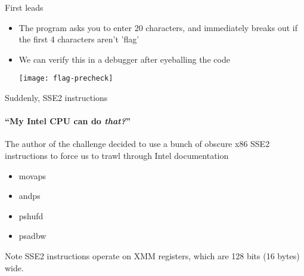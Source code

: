 \begin{frame}{First leads}
    \begin{itemize}
        \item<1-> The program asks you to enter 20 characters, and immediately
                  breaks out if the first 4 characters aren't 'flag'
        \item<2-> We can verify this in a debugger after eyeballing the code

        \begin{center}
             {\texttt{[image: flag-precheck]}}
        \end{center}
    \end{itemize}
\end{frame}

\begin{frame}{Suddenly, SSE2 instructions}
    \framesubtitle{``My Intel CPU can do {\em that?}''}
    The author of the challenge decided to use a bunch of obscure x86 SSE2
    instructions to force us to trawl through Intel documentation

    \begin{itemize}
        \item<2-> movaps
        \item<2-> andps
        \item<2-> pshufd
        \item<2-> psadbw
    \end{itemize}

    \begin{block}{Note}
        SSE2 instructions operate on XMM registers, which are 128 bits
        (16 bytes) wide.
    \end{block}
\end{frame}

